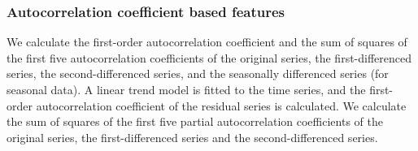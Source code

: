 \documentclass[11pt,a4paper,]{article}
\begin{document}
\hypertarget{autocorrelation-coefficient-based-features}{%
\subsubsection*{Autocorrelation coefficient based features}\label{autocorrelation-coefficient-based-features}}

We calculate the first-order autocorrelation coefficient and the sum of squares of the first five autocorrelation coefficients of the original series, the first-differenced series, the second-differenced series, and the seasonally differenced series (for seasonal data). A linear trend model is fitted to the time series, and the first-order autocorrelation coefficient of the residual series is calculated. We calculate the sum of squares of the first five partial autocorrelation coefficients of the original series, the first-differenced series and the second-differenced series.

\printbibliography
\end{document}
